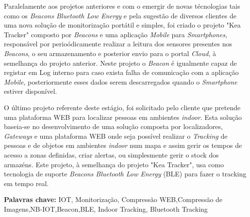 \par Paralelamente aos projetos anteriores e com o emergir de novas técnologias tais como os \textit{Beacons Bluetooth Low Energy} e pela sugestão de diversos clientes de uma nova solução de monitorização portátil e simples, foi criado o projeto "Kea Tracker" composto por \textit{Beacons} e uma aplicação \textit{Mobile} para \textit{Smartphones}, responsável por perioódicamente realizar a leitura dos sensores presentes nos \textit{Beacons}, o seu armazenamento e posterior envio para o portal \textit{Cloud}, à semelhança do projeto anterior. Neste projeto o \textit{Beacon} é igualmente capaz de registar em Log interno para caso exista falha de comunicação com a aplicação \textit{Mobile}, posteriormente esses dados serem descarregados quando o \textit{Smartphone} estiver disponível.

\par O último projeto referente deste estágio, foi solicitado pelo cliente que pretende uma plataforma WEB para localizar pessoas em ambientes \textit{indoor}. Esta solução baseia-se no desenvolvimento de uma solução composta por localizadores, \textit{Gateways} e uma plataforma WEB onde seja possível realizar o \textit{Tracking} de pessoas e de objetos em ambientes \textit{indoor} num mapa e assim gerir os tempos de acesso a zonas definidas, criar alertas, ou simplesmente gerir o stock dos armazéns. Este projeto, à semelhança do projeto "Kea Tracker", usa como tecnologia de suporte \textit{Beacons Bluetooth Low Energy} (BLE) para fazer o tracking em tempo real.




\bigskip

\textbf{Palavras chave:}
IOT, Monitorização, Compressão WEB,Compressão de Imagens,NB-IOT,Beacon,BLE, Indoor Tracking, Bluetooth Tracking